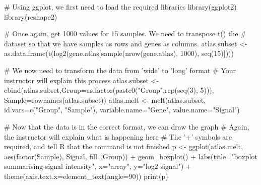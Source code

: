 \documentclass[a4paper]{book}
\newenvironment{Shaded}{}{}
\newcommand{\KeywordTok}[1]{\textcolor[rgb]{0.00,0.00,1.00}{{#1}}}
\newcommand{\DataTypeTok}[1]{{#1}}
\newcommand{\DecValTok}[1]{{#1}}
\newcommand{\StringTok}[1]{\textcolor[rgb]{0.00,0.50,0.50}{{#1}}}
\newcommand{\CommentTok}[1]{\textcolor[rgb]{0.00,0.50,0.00}{{#1}}}
\newcommand{\NormalTok}[1]{{#1}}
\newlength{\leftbarwidth}
\newlength{\leftbarsep}
\newcommand*{\leftbarcolorcmd}{\color{darkgray}}%
\renewenvironment{leftbar}{%
    \def\FrameCommand{{\leftbarcolorcmd{\vrule width \leftbarwidth\relax\hspace {\leftbarsep}}}}%
    \MakeFramed {\advance \hsize -\width \FrameRestore }%
}{%
    \endMakeFramed
}
\renewenvironment{Shaded}
{\vspace{0em}\begin{leftbar}\begin{snugshade}}
{\end{snugshade}\end{leftbar}\vspace{0pt}}
\begin{document}
\begin{Shaded}
\begin{Highlighting}[]
\CommentTok{# Using ggplot, we first need to load the required libraries}
\KeywordTok{library}\NormalTok{(ggplot2)}
\KeywordTok{library}\NormalTok{(reshape2)}

\CommentTok{# Once again, get 1000 values for 15 samples. We need to transpose t() the}
\CommentTok{# dataset so that we have samples as rows and genes as columns.}
\NormalTok{atlas.subset <-}\StringTok{ }\KeywordTok{as.data.frame}\NormalTok{(}\KeywordTok{t}\NormalTok{(}\KeywordTok{log2}\NormalTok{(gene.atlas[}\KeywordTok{sample}\NormalTok{(}\KeywordTok{nrow}\NormalTok{(gene.atlas), }\DecValTok{1000}\NormalTok{),}
                                                \KeywordTok{seq}\NormalTok{(}\DecValTok{15}\NormalTok{)])))}

\CommentTok{# We now need to transform the data from 'wide' to 'long' format}
\CommentTok{# Your instructor will explain this process}
\NormalTok{atlas.subset <-}\StringTok{ }\KeywordTok{cbind}\NormalTok{(atlas.subset,}\DataTypeTok{Group=}\KeywordTok{as.factor}\NormalTok{(}\KeywordTok{paste0}\NormalTok{(}\StringTok{"Group"}\NormalTok{,}\KeywordTok{rep}\NormalTok{(}\KeywordTok{seq}\NormalTok{(}\DecValTok{3}\NormalTok{), }\DecValTok{5}\NormalTok{))),}
                      \DataTypeTok{Sample=}\KeywordTok{rownames}\NormalTok{(atlas.subset))}
\NormalTok{atlas.melt <-}\StringTok{ }\KeywordTok{melt}\NormalTok{(atlas.subset,}
                   \DataTypeTok{id.vars=}\KeywordTok{c}\NormalTok{(}\StringTok{"Group"}\NormalTok{, }\StringTok{"Sample"}\NormalTok{),}
                   \DataTypeTok{variable.name=}\StringTok{"Gene"}\NormalTok{,}
                   \DataTypeTok{value.name=}\StringTok{"Signal"}\NormalTok{)}

\CommentTok{# Now that the data is in the correct format, we can draw the graph}
\CommentTok{# Again, the instructor will explain what is happening here}
\CommentTok{# The '+' symbols are required, and tell R that the command is not finished}
\NormalTok{p <-}\StringTok{ }\KeywordTok{ggplot}\NormalTok{(atlas.melt, }\KeywordTok{aes}\NormalTok{(}\KeywordTok{factor}\NormalTok{(Sample), Signal, }\DataTypeTok{fill=}\NormalTok{Group)) +}\StringTok{ }
\StringTok{  }\KeywordTok{geom_boxplot}\NormalTok{() +}\StringTok{ }
\StringTok{  }\KeywordTok{labs}\NormalTok{(}\DataTypeTok{title=}\StringTok{"boxplot summarising signal intensity"}\NormalTok{, }\DataTypeTok{x=}\StringTok{"array"}\NormalTok{, }\DataTypeTok{y=}\StringTok{"log2 signal"}\NormalTok{) +}\StringTok{ }
\StringTok{  }\KeywordTok{theme}\NormalTok{(}\DataTypeTok{axis.text.x=}\KeywordTok{element_text}\NormalTok{(}\DataTypeTok{angle=}\DecValTok{90}\NormalTok{))}
\KeywordTok{print}\NormalTok{(p)}
\end{Highlighting}
\end{Shaded}
\end{document}
